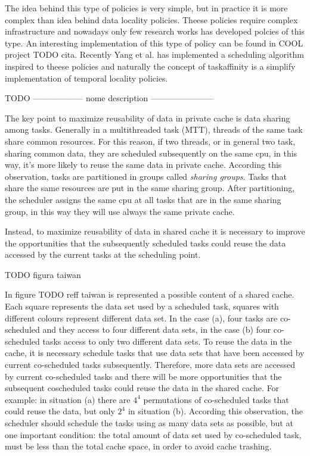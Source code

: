 The idea behind this type of policies is very simple, but in practice it is more complex than idea behind data locality policies. Theese policies require 
complex infrastructure and nowadays only few research works has developed polcies of this type. An interesting implementation of this type of policy
can be found in COOL project TODO cita. Recently Yang et al. has implemented a scheduling algorithm inspired to theese policies and naturally the concept 
of taskaffinity is a simplify implementation of temporal locality policies.

TODO ------------------ nome description -----------------------

The key point to maximize reusability of data in private cache is data sharing among tasks. Generally in a multithreaded task (MTT), threads of the same
task share common resources. For this reason, if two threads, or in general two task, sharing common data, they are scheduled subsequently on the same cpu, 
in this way, it's more likely to reuse the same data in private cache.
According this observation, tasks are partitioned in groups called \textit{sharing groups}. Tasks that share the same resources are put in the 
same sharing group. After partitioning, the scheduler assigns the same cpu at all tasks that are in the same sharing group, in this way they will use 
always the same private cache. 

Instead, to maximize reusability of data in shared cache it is necessary to improve the opportunities that the subsequently scheduled tasks could reuse the 
data accessed by the current tasks at the scheduling point.

TODO figura taiwan

In figure TODO reff taiwan is represented a possible content of a shared cache. Each square represents the data set used by a scheduled task, squares
with different colours represent different data set. In the case (a), four tasks are co-scheduled and they access to four different data sets, 
in the case (b) four co-scheduled tasks access to only two different data sets. To reuse the data in the cache, it is necessary schedule tasks that use 
data sets that have been accessed by current co-scheduled tasks subsequently. Therefore, more data sets are accessed by current co-scheduled tasks and 
there will be more opportunities that the subsequent coscheduled tasks could reuse the data in the shared cache. For example: in situation (a) there 
are $4^4$ permutations of co-scheduled tasks that could reuse the data, but only $2^4$ in situation (b). According this observation, the scheduler should 
schedule the tasks using as many data sets as possible, but at one important condition: the total amount of data set used by co-scheduled task, must be 
less than the total cache space, in order to avoid cache trashing.


